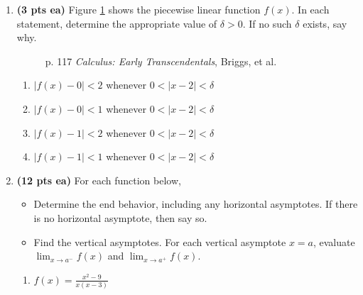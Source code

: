 \documentclass[12pt,letterpaper]{article}
\begin{document}
\begin{enumerate}
\newpage
\item {\bf (3 pts ea)} Figure \ref{fig:epsDel} shows the piecewise linear function $f(x)$.  In each statement, determine the appropriate value of $\delta>0$.  If no such $\delta$ exists, say why. 
\begin{figure}[h]
\caption{p. 117 \emph{Calculus: Early Transcendentals}, Briggs, et al.}
\label{fig:epsDel}
\end{figure}
	\begin{enumerate}
	\item $|f(x)-0|<2$ whenever $0<|x-2|<\delta$
	
	\vspace{6pc}
	\item $|f(x)-0|<1$ whenever $0<|x-2|<\delta$
	
	\vspace{6pc}
	\item $|f(x)-1|<2$ whenever $0<|x-2|<\delta$
	
	\vspace{6pc}
	\item $|f(x)-1|<1$ whenever $0<|x-2|<\delta$
	\end{enumerate}
	
\newpage
\item {\bf (12 pts ea)} For each function below,
\begin{itemize}
\item Determine the end behavior, including any horizontal asymptotes.  If there is no horizontal asymptote, then say so.   
\item Find the vertical asymptotes.  For each vertical asymptote $x=a$, evaluate $\displaystyle\lim_{x\to a^-}f(x)$ and $\displaystyle\lim_{x\to a^+}f(x)$. 
\end{itemize}

\vspace{1pc}
\begin{enumerate}
\item $f(x)=\displaystyle\frac{x^2-9}{x(x-3)}$


\end{enumerate}
\end{enumerate}
\end{document}
